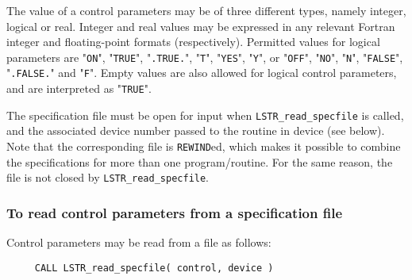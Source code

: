\documentclass{galahad}
\newcommand{\packagename}{LS\-TR}
\begin{document}
The value of a control parameters may be of three different types, namely
integer, logical or real.
Integer and real values may be expressed in any relevant Fortran integer and
floating-point formats (respectively). Permitted values for logical
parameters are "{\tt ON}", "{\tt TRUE}", "{\tt .TRUE.}", "{\tt T}",
"{\tt YES}", "{\tt Y}", or "{\tt OFF}", "{\tt NO}",
"{\tt N}", "{\tt FALSE}", "{\tt .FALSE.}" and "{\tt F}".
Empty values are also allowed for
logical control parameters, and are interpreted as "{\tt TRUE}".

The specification file must be open for
input when {\tt \packagename\_read\_specfile}
is called, and the associated device number
passed to the routine in device (see below).
Note that the corresponding
file is {\tt REWIND}ed, which makes it possible to combine the specifications
for more than one program/routine.  For the same reason, the file is not
closed by {\tt \packagename\_read\_specfile}.

\subsubsection{To read control parameters from a specification file}
\label{readspec}

Control parameters may be read from a file as follows:
\hskip0.5in
\def\baselinestretch{0.8} {\tt \begin{verbatim}
     CALL LSTR_read_specfile( control, device )
\end{verbatim}}
\def\baselinestretch{1.0}
\end{document}
